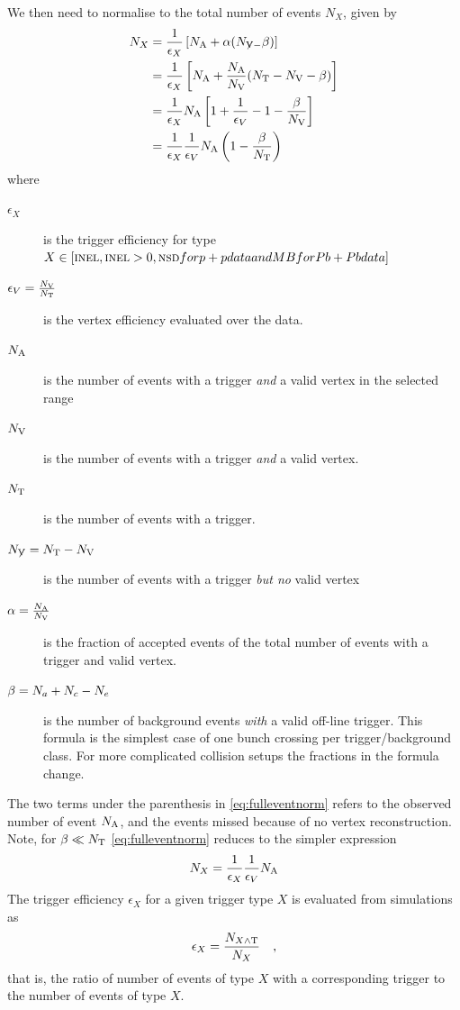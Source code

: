 \documentclass[11pt]{article}
\begin{document}
We then need to normalise to the total number of events $N_X$, given
by 
\begin{align}
  {\ensuremath N_{X}} &= \frac{1}{\epsilon_X}\left[{N_{\text{A}}} + \alpha({N_{\not{\text{V}}-}}
    \beta)\right]  \label{eq:fulleventnorm}\\
  & = \frac{1}{\epsilon_X}\left[{N_{\text{A}}} + \frac{{N_{\text{A}}}}{{N_{\text{V}}}}({N_{\text{T}}}-{N_{\text{V}}}{} -
    \beta)\right]\nonumber \\
  & =\frac{1}{\epsilon_X}{N_{\text{A}}}\left[1+\frac{1}{\epsilon_V}-1-
    \frac{\beta}{{N_{\text{V}}}}\right]\nonumber\\ 
  & = \frac{1}{\epsilon_X}\frac{1}{\epsilon_V}{N_{\text{A}}}
  \left(1-\frac{\beta}{{N_{\text{T}}}{}}\right)\nonumber
\end{align}
where
\begin{description}
\item[$\epsilon_X$]  is the trigger efficiency for type
  $X\in[\text{\INEL},\text{\INELONE},\text{\NSD} for p+p data and MB
  for Pb+Pb data]$
\item[$\epsilon_V=\frac{{N_{\text{V}}}{}}{{N_{\text{T}}}{}}$] is the vertex efficiency
  evaluated over the data.
\item[${N_{\text{A}}}$] is the number of events with a trigger \emph{and} a valid
  vertex in the selected range
\item[${N_{\text{V}}}{}$] is the number of events with a trigger \emph{and} a valid
  vertex. 
\item[${N_{\text{T}}}$] is the number of events with a trigger.
\item[${N_{\not{\text{V}}}}={N_{\text{T}}}-{N_{\text{V}}}{}$] is the number of events with a trigger
  \emph{but no} valid vertex
\item[$\alpha=\frac{{N_{\text{A}}}}{{N_{\text{V}}}}$] is the fraction of accepted events of
  the total number of events with a trigger and valid vertex.  
\item[$\beta={N_{a}}+{N_{c}}-{N_{e}}$] is the number of background
  events \emph{with} a valid off-line trigger. This formula is the
  simplest case of one bunch crossing per trigger/background
  class. For more complicated collision setups the fractions in the
  formula change.
\end{description}
The two terms under the parenthesis in \eqref{eq:fulleventnorm} refers
to the observed number of event ${N_{\text{A}}}$, and the events missed because
of no vertex reconstruction.  Note, for $\beta\ll{\ensuremath N_{\text{T}}}{}$
\eqref{eq:fulleventnorm} reduces to the simpler expression
$$
{N_{X}} = \frac1{\epsilon_X}\frac1{\epsilon_V}{N_{\text{A}}}{}
$$
The trigger efficiency $\epsilon_X$ for a given trigger type $X$ is
evaluated from simulations as
\begin{align}
  \epsilon_X = \frac{{N_{X\wedge \text{T}}}}{{N_{X}}}\quad,
\end{align}
that is, the ratio of number of events of type $X$ with a
corresponding trigger to the number of events of type $X$. 
\end{document}
